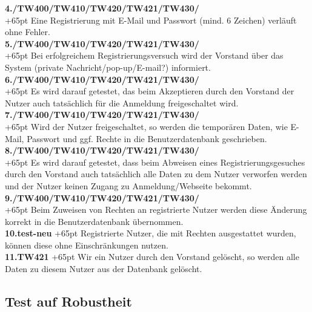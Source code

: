 \documentclass[fontsize = 12pt, paper = a4]{scrreprt}
\begin{document}
\textbf{4./TW400/TW410/TW420/TW421/TW430/}\\
\hangindent+65pt 
Eine Registrierung mit E-Mail und Passwort (mind. 6 Zeichen) verläuft ohne Fehler.\\

\textbf{5./TW400/TW410/TW420/TW421/TW430/}\\
\hangindent+65pt 
Bei erfolgreichem Registrierungsversuch wird der Vorstand über das System (private Nachricht/pop-up/E-mail?) informiert.\\

\textbf{6./TW400/TW410/TW420/TW421/TW430/}\\
\hangindent+65pt 
Es wird darauf getestet, das beim Akzeptieren durch den Vorstand der Nutzer auch tatsächlich für die Anmeldung freigeschaltet wird.\\

\textbf{7./TW400/TW410/TW420/TW421/TW430/}\\
\hangindent+65pt 
Wird der Nutzer freigeschaltet, so werden die temporären Daten, wie E-Mail, Passwort und ggf. Rechte in die Benutzerdatenbank geschrieben.\\

\textbf{8./TW400/TW410/TW420/TW421/TW430/}\\
\hangindent+65pt 
Es wird darauf getestet, dass beim Abweisen eines Registrierungsgesuches durch den Vorstand auch tatsächlich alle Daten zu dem Nutzer verworfen werden und der Nutzer keinen Zugang zu Anmeldung/Webseite bekommt. \\

\textbf{9./TW400/TW410/TW420/TW421/TW430/}\\
\hangindent+65pt 
Beim Zuweisen von Rechten an registrierte Nutzer werden diese Änderung korrekt in die Benutzerdatenbank übernommen.\\

\textbf{10.test-neu}
\hangindent+65pt 
Registrierte Nutzer, die mit Rechten ausgestattet wurden, können diese ohne Einschränkungen nutzen.\\

\textbf{11.TW421}
\hangindent+65pt 
Wir ein Nutzer durch den Vorstand gelöscht, so werden alle Daten zu diesem Nutzer aus der Datenbank gelöscht.



\subsection*{Test auf Robustheit}
\end{document}
